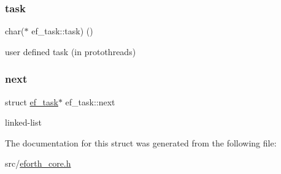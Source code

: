 \subsubsection{\texorpdfstring{task}{task}}
{\footnotesize\ttfamily char($\ast$ ef\+\_\+task\+::task) ()}



user defined task (in protothreads) 

\mbox{\label{structef__task_a7ca29f94c5801eeb742c458ab15cb9e4}} 
\subsubsection{\texorpdfstring{next}{next}}
{\footnotesize\ttfamily struct \hyperlink{structef__task}{ef\+\_\+task}$\ast$ ef\+\_\+task\+::next}



linked-\/list 



The documentation for this struct was generated from the following file\+:\begin{DoxyCompactItemize}
\item 
src/\hyperlink{eforth__core_8h}{eforth\+\_\+core.\+h}\end{DoxyCompactItemize}

